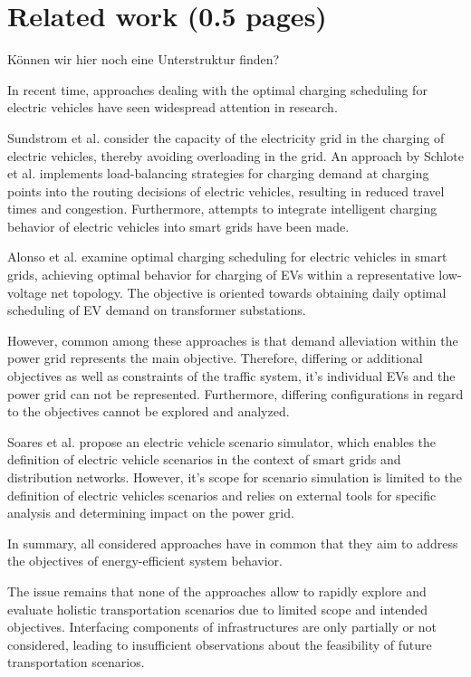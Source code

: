 \section{Related work (0.5 pages)}
\label{section:related_work}

{\color{red} K\"onnen wir hier noch eine Unterstruktur finden?}

In recent time, approaches dealing with the optimal charging scheduling for electric vehicles have seen widespread attention in research. 

Sundstrom et al. \cite{sundstrom2010planning} consider the capacity of the electricity grid in the charging of electric vehicles, thereby avoiding overloading in the grid.
An approach by Schlote et al. \cite{schlote2012balanced} implements load-balancing strategies for charging demand at charging points into the routing decisions of electric vehicles, resulting in reduced travel times and congestion. 
Furthermore, attempts to integrate intelligent charging behavior of electric vehicles into smart grids have been made. 

Alonso et al. \cite{alonso2014optimal} examine optimal charging scheduling for electric vehicles in smart grids, achieving optimal behavior for charging of EVs within a representative low-voltage net topology. The objective is oriented towards obtaining daily optimal scheduling of EV demand on transformer substations.

However, common among these approaches is that demand alleviation within the power grid represents the main objective. Therefore, differing or additional objectives as well as constraints of the traffic system, it's individual EVs and the power grid can not be represented. Furthermore, differing configurations in regard to the objectives cannot be explored and analyzed. 

Soares et al. \cite{soares2012electric} propose an electric vehicle scenario simulator, which enables the definition of electric vehicle scenarios in the context of smart grids and distribution networks.
However, it's scope for scenario simulation is limited to the definition of electric vehicles scenarios and relies on external tools for specific analysis and determining impact on the power grid.

In summary, all considered approaches have in common that they aim to address the objectives of energy-efficient system behavior.

The issue remains that none of the approaches allow to rapidly explore and evaluate holistic transportation scenarios due to limited scope and intended objectives. Interfacing components of infrastructures are only partially or not considered, leading to insufficient observations about the feasibility of future transportation scenarios.